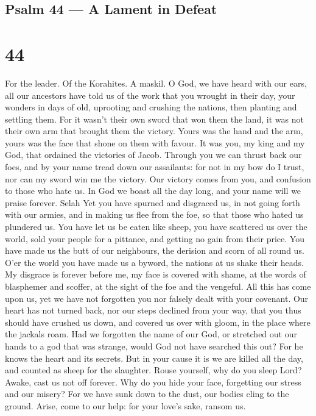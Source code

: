 \hypertarget{psalm-44-a-lament-in-defeat}{%
\subsection{Psalm 44 --- A Lament in
Defeat}\label{psalm-44-a-lament-in-defeat}}

\hypertarget{section-43}{%
\section{44}\label{section-43}}

For the leader. Of the Korahites. A maskil.  O God, we have
heard with our ears, all our ancestors have told us of the work that you
wrought in their day, your wonders in days of old, 
uprooting and crushing the nations, then planting and settling them. For
it wasn't their own sword that won them the land,  it was
not their own arm that brought them the victory. Yours was the hand and
the arm, yours was the face that shone on them with favour. 
It was you, my king and my God, that ordained the victories of Jacob.
 Through you we can thrust back our foes, and by your name
tread down our assailants:  for not in my bow do I trust,
nor can my sword win me the victory.  Our victory comes from
you, and confusion to those who hate us.  In God we boast
all the day long, and your name will we praise forever. Selah
 Yet you have spurned and disgraced us, in not going forth
with our armies,  and in making us flee from the foe, so
that those who hated us plundered us.  You have let us be
eaten like sheep, you have scattered us over the world, 
sold your people for a pittance, and getting no gain from their price.
 You have made us the butt of our neighbours, the derision
and scorn of all round us.  O'er the world you have made us
a byword, the nations at us shake their heads.  My disgrace
is forever before me, my face is covered with shame,  at
the words of blasphemer and scoffer, at the sight of the foe and the
vengeful.  All this has come upon us, yet we have not
forgotten you nor falsely dealt with your covenant.  Our
heart has not turned back, nor our steps declined from your way,
 that you thus should have crushed us down, and covered us
over with gloom, in the place where the jackals roam.  Had
we forgotten the name of our God, or stretched out our hands to a god
that was strange,  would God not have searched this out?
For he knows the heart and its secrets.  But in your cause
it is we are killed all the day, and counted as sheep for the slaughter.
 Rouse yourself, why do you sleep Lord? Awake, cast us not
off forever.  Why do you hide your face, forgetting our
stress and our misery?  For we have sunk down to the dust,
our bodies cling to the ground.  Arise, come to our help:
for your love's sake, ransom us.

